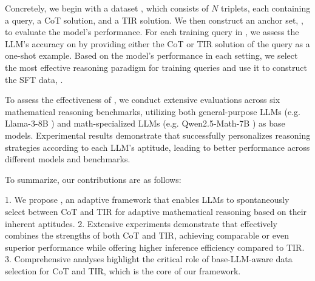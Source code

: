 Concretely, we begin with a dataset {\dd}, which consists of $N$ triplets, each containing a query, a CoT solution, and a TIR solution.
We then construct an anchor set, {\danchor}, to evaluate the model's performance. For each training query in {\dd}, we assess the LLM's accuracy on {\danchor} by providing either the CoT or TIR solution of the query as a one-shot example. 
Based on the model's performance in each setting, we select the most effective reasoning paradigm for training queries and use it to construct the SFT data, {\dsft}.

To assess the effectiveness of {\method}, we conduct extensive evaluations across six mathematical reasoning benchmarks, utilizing both general-purpose LLMs (e.g. Llama-3-8B \citep{llama3modelcard}) and math-specialized LLMs (e.g. Qwen2.5-Math-7B \citep{Qwen25Math2024Yang}) as base models. 
Experimental results demonstrate that {\method} successfully personalizes reasoning strategies according to each LLM’s aptitude, leading to better performance across different models and benchmarks.

To summarize, our contributions are as follows:

1. We propose {\method}, an adaptive framework that enables LLMs to spontaneously select between CoT and TIR for adaptive mathematical reasoning based on their inherent aptitudes.  
2. Extensive experiments demonstrate that {\method} effectively combines the strengths of both CoT and TIR, achieving comparable or even superior performance while offering higher inference efficiency compared to TIR. 
3. Comprehensive analyses highlight the critical role of base-LLM-aware data selection for CoT and TIR, which is the core of our {\method} framework. 